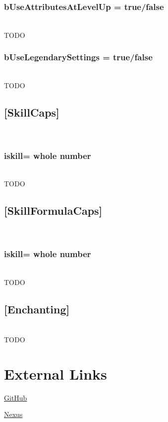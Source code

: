 \documentclass[12pt]{amsart}
\begin{document}
\subsubsection{bUseAttributesAtLevelUp = \textlangle true/false\textrangle}\hfill\\

TODO

\stopblock

\startblock
\subsubsection{bUseLegendarySettings = \textlangle true/false\textrangle}\hfill\\

TODO

\stopblock

\startblock
\subsection{[SkillCaps]}\hfill\\
\subsubsection{i\textlangle skill\textrangle = \textlangle whole number\textrangle}\hfill\\

TODO

\stopblock

\startblock
\subsection{[SkillFormulaCaps]}\hfill\\
\subsubsection{i\textlangle skill\textrangle = \textlangle whole number\textrangle}\hfill\\

TODO

\stopblock

\startblock
\subsection{[Enchanting]}\hfill\\

TODO

\stopblock

\startblock
\section{External Links}

\href{https://github.com/TheDreadedAndy/SkyrimAEUncapper-Rust}{GitHub}

\href{https://www.nexusmods.com/skyrimspecialedition/mods/82558}{Nexus}
\stopblock
\end{document}

